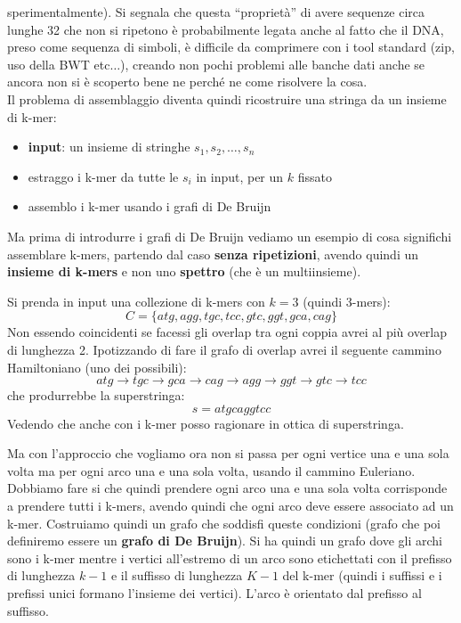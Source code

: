 \documentclass[a4paper,12pt, oneside]{book}
\begin{document}
sperimentalmente). Si segnala che questa ``proprietà'' di avere sequenze circa
lunghe 32 che non si ripetono è probabilmente legata anche al fatto che il DNA,
preso come sequenza di simboli, è difficile da comprimere con i tool standard
(zip, uso della BWT etc$\ldots$), creando non pochi problemi alle banche dati
anche se ancora non si è scoperto bene ne perché ne come risolvere la cosa.\\  
Il problema di assemblaggio diventa quindi ricostruire una stringa da un insieme
di k-mer:
\begin{itemize}
  \item \textbf{input}: un insieme di stringhe $s_1,s_2,\ldots,s_n$
  \item estraggo i k-mer da tutte le $s_i$ in input, per un $k$ fissato
  \item assemblo i k-mer usando i grafi di De Bruijn
\end{itemize}
Ma prima di introdurre i grafi di De Bruijn vediamo un esempio di cosa
significhi assemblare k-mers, partendo dal caso \textbf{senza ripetizioni},
avendo quindi un \textbf{insieme di k-mers} e non uno \textbf{spettro} (che è un
multiinsieme).
\begin{esempio}
  Si prenda in input una collezione di k-mers con $k=3$ (quindi 3-mers):
  \[C=\{atg, agg, tgc,tcc, gtc, ggt, gca, cag\}\]
  Non essendo coincidenti se facessi gli overlap tra ogni coppia avrei al più
  overlap di lunghezza 2. Ipotizzando di fare il grafo di overlap avrei il
  seguente cammino Hamiltoniano (uno dei possibili):
  \[atg\to tgc\to gca\to cag\to agg\to ggt\to gtc\to tcc\]
  che produrrebbe la superstringa:
  \[s=atgcaggtcc\]
  Vedendo che anche con i k-mer posso ragionare in ottica di superstringa.
\end{esempio}
Ma con l'approccio che vogliamo ora non si passa per ogni vertice una e una
sola volta ma per ogni arco una e una sola volta, usando il cammino
Euleriano.\\
Dobbiamo fare si che quindi prendere ogni arco una e una sola volta
corrisponde a prendere tutti i k-mers, avendo quindi che ogni arco deve essere
associato ad un k-mer. Costruiamo quindi un grafo che soddisfi queste
condizioni (grafo che poi definiremo essere un \textbf{grafo di De
  Bruijn}). Si ha quindi un grafo dove gli archi sono i k-mer mentre i vertici
all'estremo di un arco sono etichettati con il prefisso di lunghezza $k-1$ e
il suffisso di lunghezza $K-1$ del
k-mer (quindi i suffissi e i prefissi unici formano l'insieme dei
vertici). L'arco è orientato dal prefisso al suffisso. \\
\end{document}
